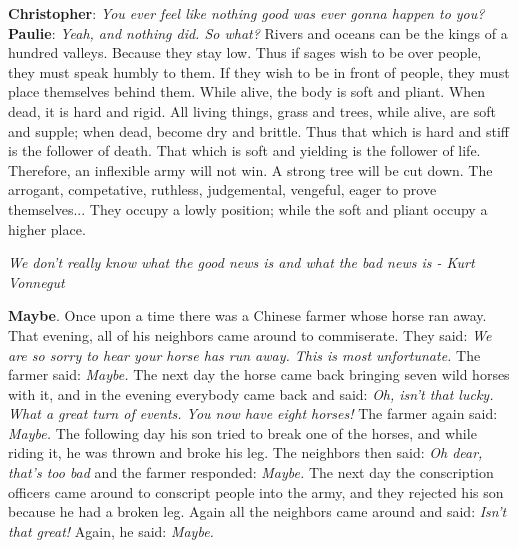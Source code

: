 \documentclass[a4paper,hidelinks]{article}
\begin{document}
\newpage

{\setlength\parindent{0pt}
\textbf{Christopher}: \textit{You ever feel like nothing good was ever gonna happen to you?}
\textbf{Paulie}: \textit{Yeah, and nothing did. So what?}
}
\newline
\newline
Rivers and oceans can be the kings of a hundred valleys.
Because they stay low.
Thus if sages wish to be over people, they must speak humbly to them.
If they wish to be in front of people, they must place themselves behind them.
While alive, the body is soft and pliant.
When dead, it is hard and rigid.
All living things, grass and trees, while alive, are soft and supple; when dead, become dry and brittle.
Thus that which is hard and stiff is the follower of death.
That which is soft and yielding is the follower of life.
Therefore, an inflexible army will not win.
A strong tree will be cut down.
The arrogant, competative, ruthless, judgemental, vengeful, eager to prove themselves...
They occupy a lowly position; while the soft and pliant occupy a higher place.

\newpage

\begin{center}
\textit{
We don’t really know what the good news is and what the bad news is - Kurt Vonnegut
}
\end{center}

\textbf{Maybe}.
Once upon a time there was a Chinese farmer whose horse ran away.
That evening, all of his neighbors came around to commiserate.
They said: \textit{We are so sorry to hear your horse has run away. This is most unfortunate.}
The farmer said: \textit{Maybe.}
The next day the horse came back bringing seven wild horses with it, and in the evening everybody came back and said: \textit{Oh, isn’t that lucky. What a great turn of events. You now have eight horses!}
The farmer again said: \textit{Maybe.}
The following day his son tried to break one of the horses, and while riding it, he was thrown and broke his leg.
The neighbors then said: \textit{Oh dear, that’s too bad} and the farmer responded: \textit{Maybe.}
The next day the conscription officers came around to conscript people into the army, and they rejected his son because he had a broken leg.
Again all the neighbors came around and said: \textit{Isn’t that great!}
Again, he said: \textit{Maybe.}


\newpage
\end{document}

